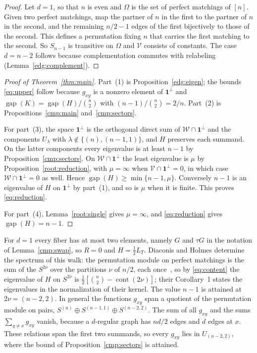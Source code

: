 \begin{proof}
Let $d=1$, so that $n$ is even and $\Omega$ is the set of perfect matchings
of $[n]$. Given two perfect matchings, map the partner of $n$ in the first to
the partner of $n$ in the second, and the remaining $n/2-1$ edges of the first
bijectively to those of the second. This defines a permutation fixing $n$
that carries the first matching to the second. So $S_{n-1}$ is transitive on
$\Omega$ and $\mathcal V$ consists of constants. The case $d=n-2$ follows
because complementation commutes with relabeling
(Lemma~\ref{edg:complement}).
\end{proof}

\begin{proof}[Proof of Theorem~\ref{thm:main}]
Part~(1) is Proposition~\ref{edg:eigen}; the bounds \eqref{eq:upper} follow
because $g_{xy}$ is a nonzero element of $\mathbf1^\perp$ and
$\operatorname{gap}(K)=\operatorname{gap}(H)/\binom n2$ with
$(n-1)/\binom n2=2/n$. Part~(2) is Propositions~\ref{cmp:main}
and~\ref{cmp:sectors}.

For part~(3), the space $\mathbf1^\perp$ is the orthogonal direct sum of
$\mathcal W\cap\mathbf1^\perp$ and the components $U_\lambda$ with
$\lambda\notin\{(n),(n-1,1)\}$, and $H$ preserves each summand. On the latter
components every eigenvalue is at least $n-1$ by
Proposition~\ref{cmp:sectors}. On $\mathcal W\cap\mathbf1^\perp$ the least
eigenvalue is $\mu$ by Proposition~\ref{root:reduction}, with $\mu=\infty$
when $\mathcal V\cap\mathbf1^\perp=0$, in which case
$\mathcal W\cap\mathbf1^\perp=0$ as well. Hence
$\operatorname{gap}(H)\ge\min\{n-1,\mu\}$. Conversely $n-1$ is an eigenvalue
of $H$ on $\mathbf1^\perp$ by part~(1), and so is $\mu$ when it is finite. This
proves \eqref{eq:reduction}.

For part~(4), Lemma~\ref{root:single} gives $\mu=\infty$, and
\eqref{eq:reduction} gives $\operatorname{gap}(H)=n-1$.
\end{proof}

\begin{remark}\label{root:matchings}
For $d=1$ every fiber has at most two elements, namely $G$ and $\tau G$ in the
notation of Lemma~\ref{cmp:swap}, so $R=0$ and $H=\tfrac12L_T$. Diaconis and
Holmes determine the spectrum of this walk: the
permutation module on perfect matchings is the sum of the $S^{2\nu}$ over the
partitions $\nu$ of $n/2$, each once~\cite[Theorem~2]{DH02}, so by
\eqref{eq:content} the eigenvalue of $H$ on $S^{2\nu}$ is
$\tfrac12[\binom n2-\operatorname{cont}(2\nu)]$; their Corollary~1 states
the eigenvalues in the normalization of their kernel. The value $n-1$
is attained at $2\nu=(n-2,2)$. In general the functions $g_{xy}$ span a
quotient of the permutation module on pairs,
$S^{(n)}\oplus S^{(n-1,1)}\oplus S^{(n-2,2)}$. The sum of all $g_{xy}$ and the
sums $\sum_{y\ne x}g_{xy}$ vanish, because a $d$-regular graph has $nd/2$
edges and $d$ edges at $x$. These relations span the first two summands, so
every $g_{xy}$ lies in $U_{(n-2,2)}$, where the bound of
Proposition~\ref{cmp:sectors} is attained.
\end{remark}

